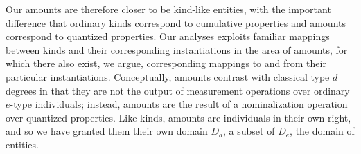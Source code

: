 \documentclass[a4paper,12pt,twoside]{article}
\begin{document}
    Our amounts are therefore closer to be kind-like entities, with the important difference that ordinary kinds correspond to cumulative properties and amounts correspond to quantized properties. Our analyses exploits familiar mappings between kinds and their corresponding instantiations in the area of amounts, for which there also exist, we argue, corresponding mappings  to and from their particular instantiations. Conceptually, amounts contrast with classical type $d$ degrees in that they are not the output of measurement operations over ordinary $e$-type individuals; instead, amounts are the result of a nominalization operation over quantized properties. Like kinds, amounts are individuals in their own right, and so we have granted them their own domain $D_a$, a subset of $D_e$, the domain of entities.
	
	
	
\end{document}
